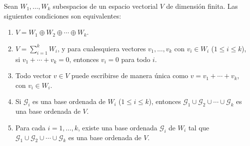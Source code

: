 \documentclass[12pt,a4paper]{book}
\begin{document}
    \begin{teorema}
        Sean $W_1,\dots,W_k$ subespacios de un espacio vectorial $V$ de dimensión finita. Las siguientes condiciones son equivalentes:
        \begin{enumerate}[label=(\alph*)]
            \item $V=W_1\oplus W_2\oplus\cdots\oplus W_k$.
            \item $V=\sum_{i=1}^{k}W_i$, y para cualesquiera vectores $v_1,\dots,v_k$ con $v_i\in W_i$ ($1\leq i\leq k$), si $v_1+\cdots+v_k=0$, entonces $v_i=0$ para todo $i$.
            \item Todo vector $v\in V$ puede escribirse de manera única como $v=v_1+\cdots+v_k$, con $v_i\in W_i$.
            \item Si $\mathcal{G}_i$ es una base ordenada de $W_i$ ($1\leq i\leq k$), entonces $\mathcal{G}_1\cup\mathcal{G}_2\cup\cdots\cup\mathcal{G}_k$ es una base ordenada de $V$.
            \item Para cada $i=1,\dots,k$, existe una base ordenada $\mathcal{G}_i$ de $W_i$ tal que $\mathcal{G}_1\cup\mathcal{G}_2\cup\cdots\cup\mathcal{G}_k$ es una base ordenada de $V$.
        \end{enumerate}
    \end{teorema}
\end{document}
